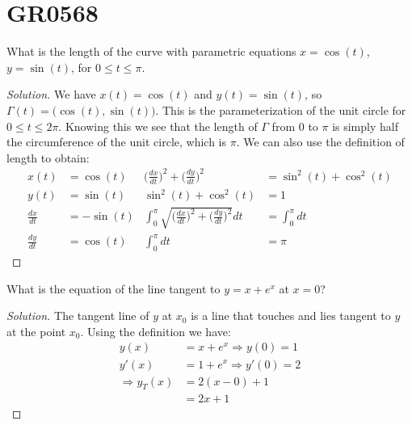 \documentclass[crop=false,class=book,oneside]{standalone}
\begin{document}
    \section{GR0568}
        \begin{problem}
            What is the length of the curve with
            parametric equations
            $x=\cos(t)$, $y=\sin(t)$, for $0\leq t\leq\pi$.
        \end{problem}
        \begin{proof}[Solution]
            We have $x(t)=\cos(t)$ and $y(t)=\sin(t)$, so
            $\Gamma(t)=\big(\cos(t),\sin(t)\big)$. This is the
            parameterization of the unit circle for
            $0\leq t\leq 2\pi$. Knowing this we see that the length
            of $\Gamma$ from $0$ to $\pi$ is simply half the
            circumference of the unit circle, which is $\pi$. We can
            also use the definition of length to obtain:
            \begin{align*}
                x(t)&=\cos(t)&
                \Big(\frac{dx}{dt}\Big)^{2}+
                \Big(\frac{dy}{dt}\Big)^{2}
                &=\sin^{2}(t)+\cos^{2}(t)\\                
                y(t)&=\sin(t)
                &\sin^{2}(t)+\cos^{2}(t)&=1\\
                \frac{dx}{dt}&=-\sin(t)
                &\int_{0}^{\pi}\sqrt{\Big(\frac{dx}{dt}\Big)^{2}+
                \Big(\frac{dy}{dt}\Big)^{2}}dt
                &=\int_{0}^{\pi}dt\\
                \frac{dy}{dt}&=\cos(t)&
                \int_{0}^{\pi}dt&=\pi
            \end{align*}
        \end{proof}
        \begin{problem}
            What is the equation of the line tangent to $y=x+e^x$
            at $x=0$?
        \end{problem}
        \begin{proof}[Solution]
            The tangent line of $y$ at $x_{0}$
            is a line that touches
            and lies tangent to $y$ at the point $x_{0}$. Using the
            definition we have:
            \begin{align*}
                y(x)&=x+e^{x}\Rightarrow y(0)=1\\
                y'(x)&=1+e^{x}\Rightarrow y'(0)=2\\
                \Rightarrow y_{T}(x)&=2(x-0)+1\\
                &=2x+1
            \end{align*}
        \end{proof}
\end{document}
